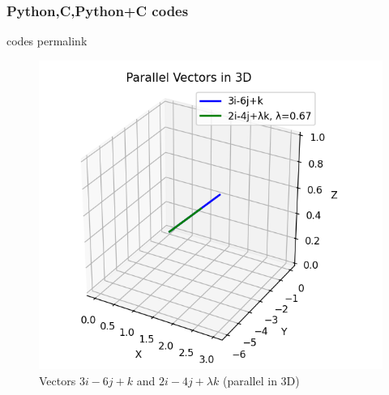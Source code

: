 \documentclass{beamer}
\begin{document}
\begin{frame}[fragile]
\frametitle{Python,C,Python+C codes}
codes permalink
\end{frame}

\begin{frame}
\begin{figure}
    \centering
    \includegraphics[width=0.5\columnwidth]{figs/fig.png}
    \caption{Vectors $3i-6j+k$ and $2i-4j+\lambda k$ (parallel in 3D)}
    \label{fig:Vectors}
\end{figure}
\end{frame}
\end{document}
